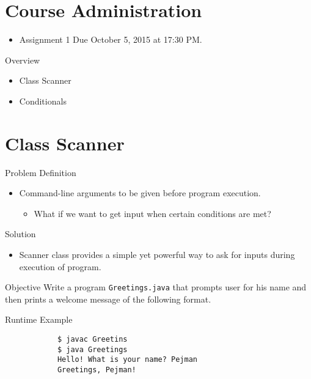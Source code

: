 \documentclass[10pt, compress]{beamer}
\begin{document}
\prepareCover

\section{Course Administration}

\begin{slide}
	\begin{itemize}
		\item[] Assignment 1 Due October 5, 2015 at 17:30 PM.
	\end{itemize}
\end{slide}

\begin{slide}
	\begin{block}{Overview}
		\begin{itemize}
			\item[] Class Scanner
			\item[] Conditionals
		\end{itemize}
	\end{block}
\end{slide}

\section{Class Scanner}

\begin{slide}
	\begin{block}{Problem Definition}
		\begin{itemize}
			\item[] Command-line arguments to be given before program execution.
			\begin{itemize}
				\item[] What if we want to get input when certain conditions are met?
			\end{itemize}
		\end{itemize}
	\end{block}
	\begin{block}{Solution}
		\begin{itemize}
			\item[] Scanner class provides a simple yet powerful way to ask for inputs during execution of program.
		\end{itemize}
	\end{block}
\end{slide}

\begin{slide}
	\begin{block}{Objective}
		Write a program \texttt{Greetings.java} that prompts user for his name and then prints a welcome message of the following format.
	\end{block}
	\begin{block}{Runtime Example}
		\begin{verbatim}
			$ javac Greetins
			$ java Greetings
			Hello! What is your name? Pejman
			Greetings, Pejman!
		\end{verbatim}
	\end{block}
\end{slide}
\end{document}
